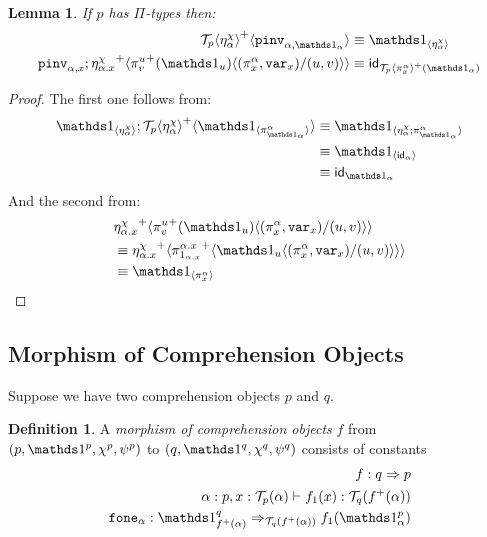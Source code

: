 \documentclass[10pt]{article}
\newtheorem{lemma}{Lemma}
\theoremstyle{definition}
\newtheorem{definition}{Definition}
\newcommand{\yields}{\vdash}
\newcommand{\tcell}{\Rightarrow}
\newcommand{\id}{\mathsf{id}}
\newcommand\TrPlus[2]{\ensuremath{{#1}^+(#2)}}
\newcommand\El[2]{\mathcal{T}_{#1}(#2)}
\newcommand\ApEl[2]{\mathcal{T}_{#1}\langle#2\rangle}
\newcommand\ap[2]{\ensuremath{#1 \langle #2 \rangle }}
\newcommand\ApPlus[2]{\ensuremath{{#1}^+ \langle #2 \rangle }}
\begin{document}
\begin{lemma}
If $p$ has $\Pi$-types then:
\begin{align*}
\ApPlus{\ApEl{p}{\eta^\chi_\alpha}}{\pinv{\alpha,\One_\alpha}} &\equiv  \ApOne{\eta^\chi_\alpha} \\
\pinv{\alpha,x};\ApPlus{\eta^\chi_{\alpha.x}}{\ap{\TrPlus{\pi^u_v}{\One_u}}{(\pi^\alpha_x,\var{x})/(u,v)}} &\equiv \id_{\TrPlus{\ApEl{p}{\pi^\alpha_x}}{\One_\alpha}}
\end{align*}
\end{lemma}
\begin{proof}
The first one follows from:
\begin{align*}
\ApOne{\eta^\chi_\alpha} ; \ApPlus{\ApEl{p}{\eta^\chi_\alpha}}{\ApOne{\pi^\alpha_{\One_\alpha}}} 
&\equiv \ApOne{\eta^\chi_\alpha;\pi^\alpha_{\One_\alpha}}  \\
&\equiv \ApOne{\id_\alpha} \\
&\equiv \id_{\One_\alpha}
\end{align*}
And the second from:
\begin{align*}
&\ApPlus{\eta^\chi_{\alpha.x}}{\ap{\TrPlus{\pi^u_v}{\One_u}}{(\pi^\alpha_x,\var{x})/(u,v)}} \\
&\equiv \ApPlus{\eta^\chi_{\alpha.x}}{\ApPlus{\pi^{\alpha.x}_{1_{\alpha.x}}}{\ap{\One_u}{(\pi^\alpha_x,\var{x})/(u,v)}}} \\
&\equiv \ApOne{\pi^\alpha_x}
\end{align*}
\end{proof}

\subsection{Morphism of Comprehension Objects}
\newcommand\fone[1]{\ensuremath{\mathtt{fone}_{#1}}}
\newcommand\foneinv[1]{\ensuremath{\mathtt{foneinv}_{#1}}}
\newcommand\fdist[1]{\ensuremath{\mathtt{fdist}_{#1}}}
\newcommand\fdistinv[1]{\ensuremath{\mathtt{fdistinv}_{#1}}}

Suppose we have two comprehension objects $p$ and $q$.

\begin{definition}\label{def:morphism-comprehension-object}
A \emph{morphism of comprehension objects} $f$ from $(p, \One^p, \chi^p, \psi^p)$ to $(q, \One^q, \chi^q, \psi^q)$ consists of constants
\begin{align*}
f : q \tcell p \\
\alpha : p, x : \El{p}{\alpha} \yields f_1(x) : \El{q}{\TrPlus{f}{\alpha}} \\
\fone{\alpha} : \One^q_{\TrPlus{f}{\alpha}}  \tcell_{\El{q}{\TrPlus{f}{\alpha}}} f_1(\One^p_\alpha)
\end{align*}
\end{definition}
\end{document}

